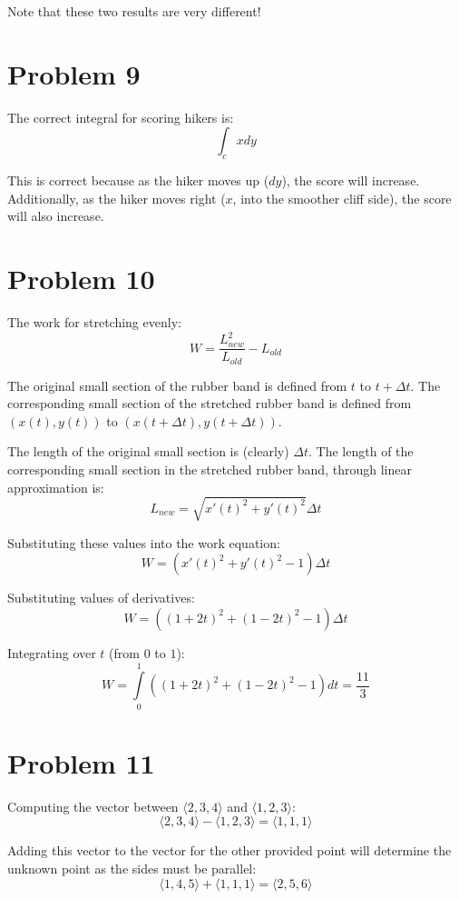 \documentclass{article}
\begin{document}
Note that these two results are very different!

\section*{Problem 9}

The correct integral for scoring hikers is:
$$ \int_c x dy $$

This is correct because as the hiker moves up ($dy$), the score will increase.
Additionally, as the hiker moves right ($x$, into the smoother cliff side), the
score will also increase.

\section*{Problem 10}

The work for stretching evenly:
$$ W = \frac{L_{new}^2}{L_{old}} - L_{old} $$

The original small section of the rubber band is defined from $t$ to $t + \Delta
t$. The corresponding small section of the stretched rubber band is defined from
$(x(t), y(t))$ to $(x(t + \Delta t), y(t + \Delta t))$. 

The length of the original small section is (clearly) $\Delta t$. The length of
the corresponding small section in the stretched rubber band, through linear
approximation is:
$$ L_{new} = \sqrt{ x'(t)^2 + y'(t)^2 } \Delta t $$

Substituting these values into the work equation:
$$ W = (x'(t)^2 + y'(t)^2 - 1) \Delta t $$

Substituting values of derivatives:
$$ W = ((1 + 2t)^2 + (1 - 2t)^2 - 1) \Delta t $$

Integrating over $t$ (from $0$ to $1$):
$$ W = \int\limits_0^1 ((1 + 2t)^2 + (1 - 2t)^2 - 1) dt = \frac{11}{3} $$

\section*{Problem 11}

Computing the vector between $\langle 2, 3, 4 \rangle$ and $\langle 1, 2, 3
\rangle$:
$$ \langle 2, 3, 4 \rangle - \langle 1, 2, 3 \rangle = \langle 1, 1, 1 \rangle$$

Adding this vector to the vector for the other provided point will determine the
unknown point as the sides must be parallel:
$$ \langle 1, 4, 5 \rangle + \langle 1, 1, 1 \rangle = \langle 2, 5, 6 \rangle
$$
\end{document}
